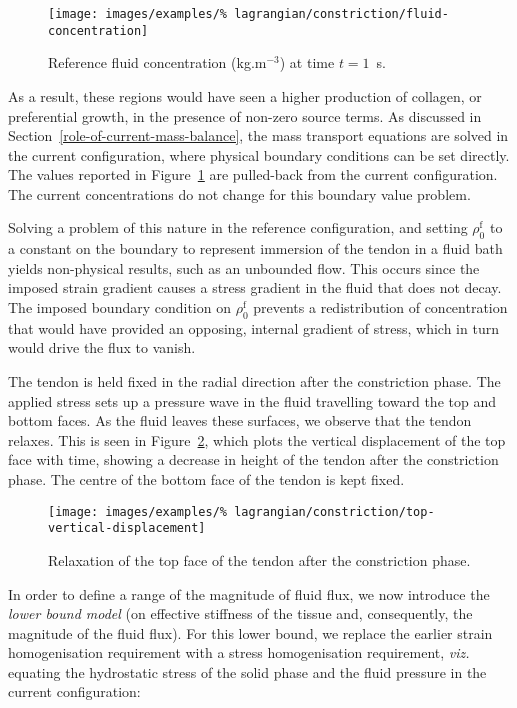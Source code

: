 \begin{figure}[!hpt]
  \centering
  \texttt{[image: images/examples/\%
    lagrangian/constriction/fluid-concentration]}
  \caption{Reference fluid concentration (kg.m$^{-3}$) at time
    $t=1$~s.}
  \label{eg2conc}
\end{figure}

As a result, these regions would have seen a higher production of
collagen, or preferential growth, in the presence of non-zero source
terms. As discussed in Section~\ref{role-of-current-mass-balance}, the
mass transport equations are solved in the current configuration,
where physical boundary conditions can be set directly. The values
reported in Figure~\ref{eg2conc} are pulled-back from the current
configuration. The current concentrations do not change for this
boundary value problem.

Solving a problem of this nature in the reference configuration, and
setting $\rho_0^\mathrm{f}$ to a constant on the boundary to represent
immersion of the tendon in a fluid bath yields non-physical results,
such as an unbounded flow. This occurs since the imposed strain
gradient causes a stress gradient in the fluid that does not
decay. The imposed boundary condition on $\rho_0^\mathrm{f}$ prevents
a redistribution of concentration that would have provided an
opposing, internal gradient of stress, which in turn would drive the
flux to vanish.

The tendon is held fixed in the radial direction after the
constriction phase. The applied stress sets up a pressure wave in the
fluid travelling toward the top and bottom faces. As the fluid leaves
these surfaces, we observe that the tendon relaxes. This is seen in
Figure~\ref{topdisp}, which plots the vertical displacement of the top
face with time, showing a decrease in height of the tendon after the
constriction phase. The centre of the bottom face of the tendon is
kept fixed.

\begin{figure}[!t]
  \centering
  \texttt{[image: images/examples/\%
    lagrangian/constriction/top-vertical-displacement]}
  \caption{Relaxation of the top face of the tendon after the
    constriction phase.}
  \label{topdisp}
\end{figure}

In order to define a range of the magnitude of fluid flux, we now
introduce the {\em lower bound model} (on effective stiffness of the
tissue and, consequently, the magnitude of the fluid flux). For this
lower bound, we replace the earlier strain homogenisation requirement
with a stress homogenisation requirement, {\em viz.} equating the
hydrostatic stress of the solid phase and the fluid pressure in the
current configuration:

